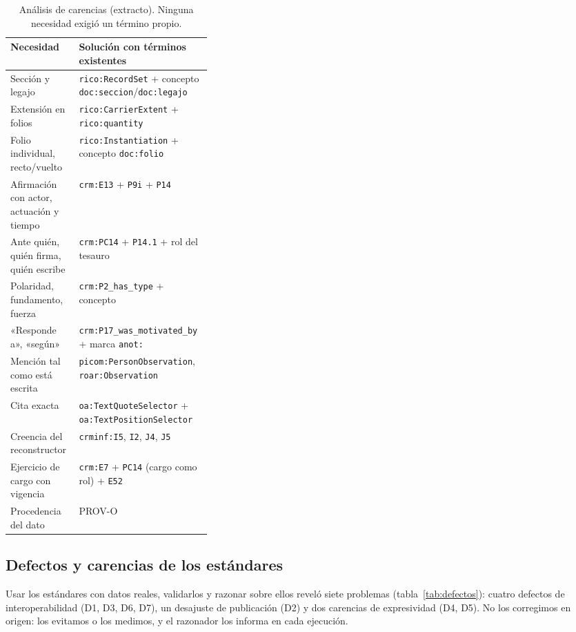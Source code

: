 \documentclass[runningheads]{llncs}
\newcommand{\ttt}[1]{\texttt{\small #1}}
\newcommand{\tablafuente}{\footnotesize\renewcommand{\ttt}[1]{\texttt{##1}}\renewcommand{\arraystretch}{1.12}}
\begin{document}
\begin{table}[tb]
\centering
\caption{Análisis de carencias (extracto). Ninguna necesidad exigió un término propio.}\label{tab:carencias}
\tablafuente
\begin{tabularx}{\linewidth}{@{}P{0.34\linewidth}L@{}}
\toprule
Necesidad & Solución con términos existentes \\
\midrule
Sección y legajo & \ttt{rico:RecordSet} + concepto \ttt{doc:seccion}/\ttt{doc:legajo} \\
Extensión en folios & \ttt{rico:CarrierExtent} + \ttt{rico:quantity} \\
Folio individual, recto/vuelto & \ttt{rico:Instantiation} + concepto \ttt{doc:folio} \\
Afirmación con actor, actuación y tiempo & \ttt{crm:E13} + \ttt{P9i} + \ttt{P14} \\
Ante quién, quién firma, quién escribe & \ttt{crm:PC14} + \ttt{P14.1} + rol del tesauro \\
Polaridad, fundamento, fuerza & \ttt{crm:P2\_has\_type} + concepto \\
«Responde a», «según» & \ttt{crm:P17\_was\_motivated\_by} + marca \ttt{anot:} \\
Mención tal como está escrita & \ttt{picom:PersonObservation}, \ttt{roar:Observation} \\
Cita exacta & \ttt{oa:TextQuoteSelector} + \ttt{oa:TextPositionSelector} \\
Creencia del reconstructor & \ttt{crminf:I5}, \ttt{I2}, \ttt{J4}, \ttt{J5} \\
Ejercicio de cargo con vigencia & \ttt{crm:E7} + \ttt{PC14} (cargo como rol) + \ttt{E52} \\
Procedencia del dato & PROV-O \\
\bottomrule
\end{tabularx}
\end{table}

\subsection{Defectos y carencias de los estándares}\label{sec:defectos}

Usar los estándares con datos reales, validarlos y razonar sobre ellos reveló siete problemas
(tabla~\ref{tab:defectos}): cuatro defectos de interoperabilidad (D1, D3, D6, D7), un desajuste de publicación (D2)
y dos carencias de expresividad (D4, D5). No los corregimos en origen: los evitamos o los medimos, y el razonador los
informa en cada ejecución.
\end{document}

